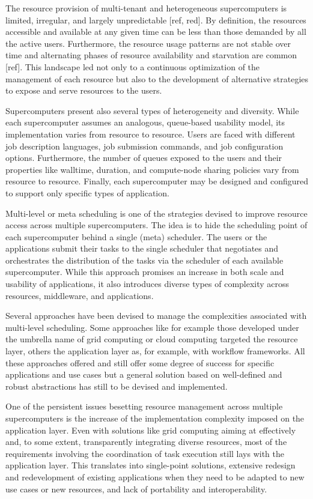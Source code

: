 \documentclass{sig-alternate}
\begin{document}
The resource provision of multi-tenant and heterogeneous supercomputers is
limited, irregular, and largely unpredictable [ref, red]. By definition, the
resources accessible and available at any given time can be less than those
demanded by all the active users. Furthermore, the resource usage patterns are
not stable over time and alternating phases of resource availability and
starvation are common [ref]. This landscape led not only to a continuous
optimization of the management of each resource but also to the development of
alternative strategies to expose and serve resources to the users.

Supercomputers present also several types of heterogeneity and diversity. While
each supercomputer assumes an analogous, queue-based usability model, its
implementation varies from resource to resource. Users are faced with different
job description languages, job submission commands, and job configuration
options. Furthermore,  the number of queues exposed to the users and their
properties like walltime, duration, and compute-node sharing policies vary from
resource to resource. Finally, each supercomputer may be designed and
configured to support only specific types of application.

Multi-level or meta scheduling is one of the strategies devised to improve
resource access across multiple supercomputers. The idea is to hide the
scheduling point of each supercomputer behind a single (meta) scheduler. The
users or the applications submit their tasks to the single scheduler that
negotiates and orchestrates the distribution of the tasks via the scheduler of
each available supercomputer. While this approach promises an increase in both
scale and usability of applications, it also introduces diverse types of
complexity across resources, middleware, and applications.

Several approaches have been devised to manage the complexities associated with
multi-level scheduling. Some approaches like for example those developed under
the umbrella name of grid computing or cloud computing targeted the resource
layer, others the application layer as, for example, with workflow frameworks.
All these approaches offered and still offer some degree of success for
specific applications and use cases but a general solution based on
well-defined and robust abstractions has still to be devised and implemented.

One of the persistent issues besetting resource management across multiple
supercomputers is the increase of the implementation complexity imposed on the
application layer. Even with solutions like grid computing aiming at
effectively and, to some extent, transparently integrating diverse resources,
most of the requirements involving the coordination of task execution still
lays with the application layer. This translates into single-point solutions,
extensive redesign and redevelopment of existing applications when they need to
be adapted to new use cases or new resources, and lack of portability and
interoperability.
\end{document}

